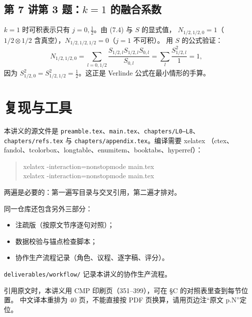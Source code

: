 \subsection*{第 7 讲第 3 题：$k=1$ 的融合系数}

$k=1$ 时可积表示只有 $j=0,\frac12$。由 (7.4) 与 $S$ 的显式值，
$N_{1/2,1/2,0}=1$（$1/2\otimes1/2$ 含真空），$N_{1/2,1/2,1/2}=0$（$j=1$ 不可积）。
用 $S$ 的公式验证：
\[
N_{1/2,1/2,0}=\sum_{l=0,1/2}\frac{S_{1/2,l}S_{1/2,l}S_{0,l}}{S_{0,l}}
=\sum_l \frac{S_{1/2,l}^2}{1}=1,
\]
因为 $S_{1/2,0}^2=S_{1/2,1/2}^2=\frac12$。这正是 Verlinde 公式在最小情形的手算。

\section{复现与工具}

本讲义的源文件是 \texttt{preamble.tex}、\texttt{main.tex}、\texttt{chapters/L0--L8}、
\texttt{chapters/refs.tex} 与 \texttt{chapters/appendix.tex}。编译需要 xelatex
（ctex、fandol、tcolorbox、longtable、enumitem、booktabs、hyperref）：

\begin{quote}
\small\ttfamily
xelatex -interaction=nonstopmode main.tex\\
xelatex -interaction=nonstopmode main.tex
\end{quote}

\noindent 两遍是必要的：第一遍写目录与交叉引用，第二遍才排对。

同一仓库还包含另外三部分：
\begin{itemize}[leftmargin=*]
  \item 注疏版（按原文节序逐句对照）；
  \item 数据校验与锚点检查脚本；
  \item 协作生产流程记录（角色、议程、逐字稿、评分）。
\end{itemize}
\texttt{deliverables/workflow/} 记录本讲义的协作生产流程。

引用原文时，本讲义用 CMP 印刷页（351--399），可在 \S C 的对照表里查到每节位置。
中文译本重排为 40 页，不能直接按 PDF 页换算，请用页边注“原文 p.N”定位。
